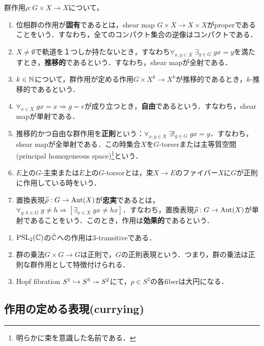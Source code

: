 \documentclass[uplatex,dvipdfmx]{jsreport}
\begin{document}
\begin{definition}
    群作用$\rho:G\times X\to X$について，
    \begin{enumerate}
        \item 位相群の作用が\textbf{固有}であるとは，shear map $G\times X\to X\times X$がproperであることをいう．すなわち，全てのコンパクト集合の逆像はコンパクトである．
        \item $X\ne\emptyset$で軌道を１つしか持たないとき，すなわち$\forall_{x,y\in X}\;\exists_{g\in G}\;gx=y$を満たすとき，\textbf{推移的}であるという．すなわち，shear mapが全射である．
        \item $k\in\mathbb{N}$について，群作用が定める作用$G\times X^k\to X^k$が推移的であるとき，$k$-推移的であるという．
        \item $\forall_{x\in X}\;gx=x\Rightarrow g=e$が成り立つとき，\textbf{自由}であるという．すなわち，shear mapが単射である．
        \item 推移的かつ自由な群作用を\textbf{正則}という：$\forall_{x,y\in X}\;\exists!_{g\in G}\;gx=y$．すなわち，shear mapが全単射である．この時集合$X$を$G$-torserまたは主等質空間(principal homogeneous space)\footnote{明らかに束を意識した名前である．}という．
        \item $E$上の$G$-主束または$E$上の$G$-torsorとは，束$X\to E$のファイバー$X$に$G$が正則に作用している時をいう．
        \item 置換表現$\widetilde{\rho}:G\to\mathrm{Aut}(X)$が\textbf{忠実}であるとは，$\forall_{g,h\in G}\;g\ne h\Rightarrow[\exists_{x\in X}\;gx\ne hx]$．すなわち，置換表現$\widetilde{\rho}:G\to\mathrm{Aut}(X)$が単射であることをいう．このとき，作用は\textbf{効果的}であるという．
    \end{enumerate}
\end{definition}
\begin{example}\mbox{}
    \begin{enumerate}
        \item $\mathrm{PSL}_2(\mathbb{C})$の$\hat{\mathbb{C}}$への作用は3-transitiveである．
        \item 群の乗法$G\times G\to G$は正則で，$G$の正則表現という．つまり，群の乗法は正則な群作用として特徴付けられる．
        \item Hopf fibration $S^1\hookrightarrow S^3\twoheadrightarrow S^2$にて，$p\in S^2$の各fiberは大円になる．
    \end{enumerate}
\end{example}

\subsection{作用の定める表現(currying)}
\end{document}
